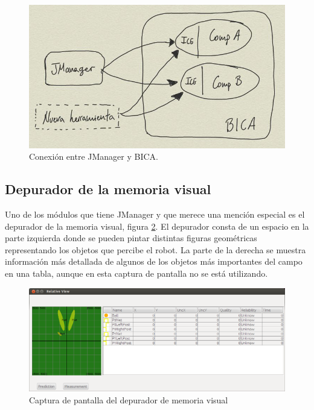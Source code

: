 \begin{figure} [h]
  \begin{center}
    \includegraphics[width=12cm]{img/cap3/jmanager}
  \end{center}
  \caption{Conexión entre JManager y BICA.}
  \label{fig:jmanager}
\end{figure}

\subsection{Depurador de la memoria visual}
\label{subsec:depuradormemoriavisual}

Uno de los módulos que tiene JManager y que merece una mención especial es el depurador de la memoria visual, figura \ref{fig:depuradormemoriavisual}. El depurador consta de un espacio en la parte izquierda donde se pueden pintar distintas figuras geométricas representando los objetos que percibe el robot. La parte de la derecha se muestra información más detallada de algunos de los objetos más importantes del campo en una tabla, aunque en esta captura de pantalla no se está utilizando. \\

\begin{figure} [h]
  \begin{center}
    \includegraphics[width=15cm]{img/cap3/depurador_memoria_visual}
  \end{center}
  \caption{Captura de pantalla del depurador de memoria visual}
  \label{fig:depuradormemoriavisual}
\end{figure}

